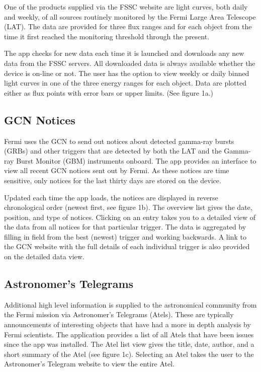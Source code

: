 One of the products supplied via the FSSC website are light curves, both daily and weekly, of all sources routinely monitored by the Fermi Large Area Telescope (LAT).  The data are provided for three flux ranges and for each object from the time it first reached the monitoring threshold through the present.

The app checks for new data each time it is launched and downloads any new data from the FSSC servers.  All downloaded data is always available whether the device is on-line or not.  The user has the option to view weekly or daily binned light curves in one of the three energy ranges for each object.  Data are plotted either as flux points with error bars or upper limits. (See figure 1a.)

\subsection{GCN Notices}
Fermi uses the GCN to send out notices about detected gamma-ray bursts (GRBs) and other triggers that are detected by both the LAT and the Gamma-ray Burst Monitor (GBM) instruments onboard.  The app provides an interface to view all recent GCN notices sent out by Fermi.  As these notices are time sensitive, only notices for the last thirty days are stored on the device.

Updated each time the app loads, the notices are displayed in reverse chronological order (newest first, see figure 1b).  The overview list gives the date, position, and type of notices.  Clicking on an entry takes you to a detailed view of the data from all notices for that particular trigger.  The data is aggregated by filling in field from the best (newest) trigger and working backwards.  A link to the GCN website with the full details of each individual trigger is also provided on the detailed data view.

\subsection{Astronomer's Telegrams}
Additional high level information is supplied to the astronomical community from the Fermi mission via Astronomer's Telegrams (Atels).  These are typically announcements of interesting objects that have had a more in depth analysis by Fermi scientists.  The application provides a list of all Atels that have been issues since the app was installed.  The Atel list view gives the title, date, author, and a short summary of the Atel (see figure 1c).  Selecting an Atel takes the user to the Astronomer's Telegram website to view the entire Atel.

